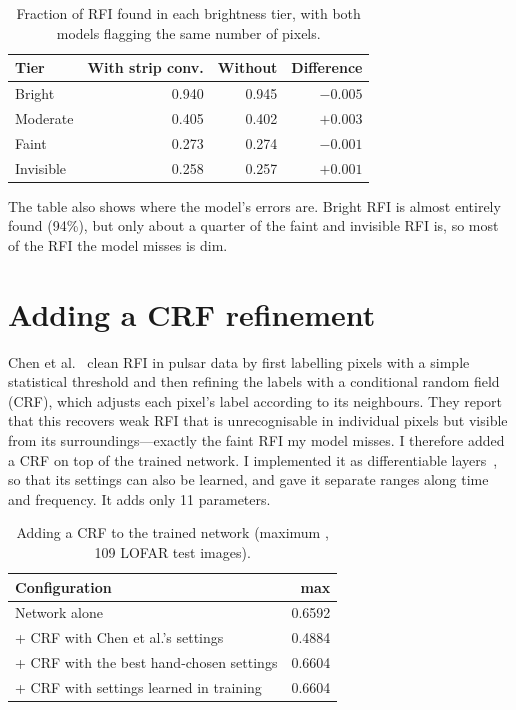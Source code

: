 \begin{table}[H]
  \centering
  \caption{Fraction of RFI found in each brightness tier, with both models
    flagging the same number of pixels.}
  \label{tab:faint}
  \begin{tabular}{lrrr}
    \toprule
    Tier & With strip conv. & Without & Difference \\
    \midrule
    Bright    & 0.940 & 0.945 & $-0.005$ \\
    Moderate  & 0.405 & 0.402 & $+0.003$ \\
    Faint     & 0.273 & 0.274 & $-0.001$ \\
    Invisible & 0.258 & 0.257 & $+0.001$ \\
    \bottomrule
  \end{tabular}
\end{table}

The table also shows where the model's errors are. Bright RFI is almost
entirely found (94\%), but only about a quarter of the faint and invisible RFI
is, so most of the RFI the model misses is dim.

\section{Adding a CRF refinement}
\label{sec:crf}
Chen et al.~\cite{chen2023} clean RFI in pulsar data by first labelling pixels
with a simple statistical threshold and then refining the labels with a
conditional random field (CRF), which adjusts each pixel's label according to
its neighbours. They report that this recovers weak RFI that is unrecognisable
in individual pixels but visible from its surroundings---exactly the faint RFI
my model misses. I therefore added a CRF on top of the trained network. I
implemented it as differentiable layers~\cite{zheng2015crfrnn,teichmann2018convcrf},
so that its settings can also be learned, and gave it separate ranges along
time and frequency. It adds only 11 parameters.

\begin{table}[H]
  \centering
  \caption{Adding a CRF to the trained network (maximum \Fone{}, 109 LOFAR test
    images).}
  \label{tab:crf}
  \begin{tabular}{lr}
    \toprule
    Configuration & max \Fone{} \\
    \midrule
    Network alone                                  & 0.6592 \\
    + CRF with Chen et al.'s settings              & 0.4884 \\
    + CRF with the best hand-chosen settings       & 0.6604 \\
    + CRF with settings learned in training        & 0.6604 \\
    \bottomrule
  \end{tabular}
\end{table}

